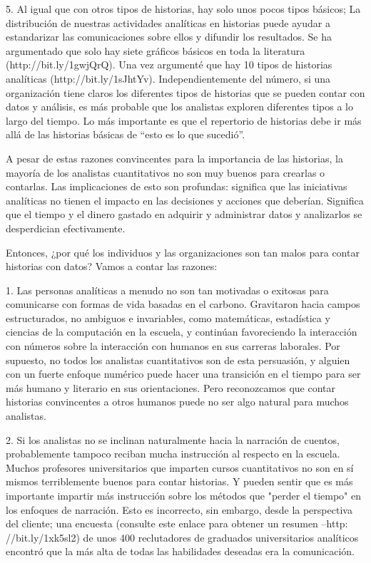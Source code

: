 \documentclass[preprint,12pt]{elsarticle}
\begin{document}
5. Al igual que con otros tipos de historias, hay solo unos pocos tipos básicos; La distribución de nuestras actividades analíticas en historias puede ayudar a estandarizar las comunicaciones sobre ellos y difundir los resultados. Se ha argumentado que solo hay siete gráficos básicos en toda la literatura (http://bit.ly/1gwjQrQ). Una vez argumenté que hay 10 tipos de historias analíticas (http://bit.ly/1sJhtYv). Independientemente del número, si una organización tiene claros los diferentes tipos de historias que se pueden contar con datos y análisis, es más probable que los analistas exploren diferentes tipos a lo largo del tiempo. Lo más importante es que el repertorio de historias debe ir más allá de las historias básicas de “esto es lo que sucedió”. \hfill \break

A pesar de estas razones convincentes para la importancia de las historias, la mayoría de los analistas cuantitativos no son muy buenos para crearlas o contarlas. Las implicaciones de esto son profundas: significa que las iniciativas analíticas no tienen el impacto en las decisiones y acciones que deberían. Significa que el tiempo y el dinero gastado en adquirir y administrar datos y analizarlos se desperdician efectivamente. \hfill \break\hfill \break

Entonces, ¿por qué los individuos y las organizaciones son tan malos para contar historias con datos? Vamos a contar las razones: \hfill \break

1. Las personas analíticas a menudo no son tan motivadas o exitosas para comunicarse con formas de vida basadas en el carbono. Gravitaron hacia campos estructurados, no ambiguos e invariables, como matemáticas, estadística y ciencias de la computación en la escuela, y continúan favoreciendo la interacción con números sobre la interacción con humanos en sus carreras laborales. Por supuesto, no todos los analistas cuantitativos son de esta persuasión, y alguien con un fuerte enfoque numérico puede hacer una transición en el tiempo para ser más humano y literario en sus orientaciones. Pero reconozcamos que contar historias convincentes a otros humanos puede no ser algo natural para muchos analistas. \hfill \break

2. Si los analistas no se inclinan naturalmente hacia la narración de cuentos, probablemente tampoco reciban mucha instrucción al respecto en la escuela. Muchos profesores universitarios que imparten cursos cuantitativos no son en sí mismos terriblemente buenos para contar historias. Y pueden sentir que es más importante impartir más instrucción sobre los métodos que "perder el tiempo" en los enfoques de narración. Esto es incorrecto, sin embargo, desde la perspectiva del cliente; una encuesta (consulte este enlace para obtener un resumen –http: //bit.ly/1xk5sl2) de unos 400 reclutadores de graduados universitarios analíticos encontró que la más alta de todas las habilidades deseadas era la comunicación. \hfill \break
\end{document}
